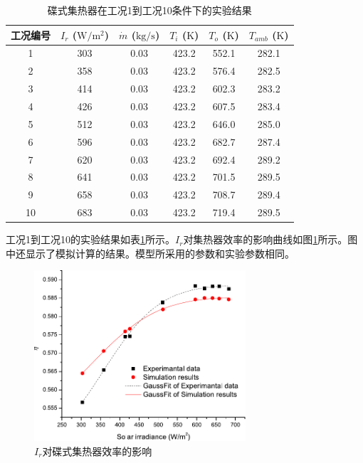 \begin{table}[htbp]\footnotesize
\setlength{\abovecaptionskip}{-10pt}
	\caption{碟式集热器在工况1到工况10条件下的实验结果}
	\begin{center}
	\begin{tabular}{cccccc}
		\toprule
		工况编号	& $I_r$ ($\mathrm{W/m^2}$)	&	$\dot{m}$ ($\mathrm{kg/s}$)			&	$T_i$ ($\mathrm{K}$)	&	$T_o$ ($\mathrm{K}$)		&	$T_{amb}$ ($\mathrm{K}$)\\
		\midrule
		1	&	303	&	0.03	&	423.2	&	552.1	&	282.1\\
		2	&	358	&	0.03	&	423.2	&	576.4	&	282.5\\
		3	&	414	&	0.03	&	423.2	&	602.3	&	283.2	\\
		4	&	426	&	0.03	&	423.2	&	607.5	&	283.4\\
		5	&	512	&	0.03	&	423.2	&	646.0	&	285.0\\
		6	&	596	&	0.03	&	423.2	&	682.7	&	287.4\\
		7	&	620	&	0.03	&	423.2	&	692.4	&	289.2\\
		8	&	641	&	0.03	&	423.2	&	701.5	&	289.5\\
		9	&	658	&	0.03	&	423.2	&	708.7	&	289.4\\
		10	&	683	&	0.03	&	423.2	&	719.4	&	289.5\\
		\bottomrule
	\end{tabular}
	\end{center}
	\label{tab:ResultOfDish1}
\end{table}
工况1到工况10的实验结果如表\ref{tab:ResultOfDish1}所示。$I_r$对集热器效率的影响曲线如图\ref{fig:I_r-eta-dish}所示。图中还显示了模拟计算的结果。模型所采用的参数和实验参数相同。
\begin{figure}[!ht]
\centering
\includegraphics[width=0.7\textwidth]{fig/I_r-eta-dish}
\caption{$I_r$对碟式集热器效率的影响}
\label{fig:I_r-eta-dish}
\end{figure}

